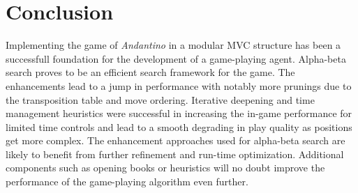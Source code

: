 \section{Conclusion}
Implementing the game of \textit{Andantino} in a modular MVC structure has been a successfull foundation for the development of a game-playing agent. Alpha-beta search proves to be an efficient search framework for the game. The enhancements lead to a jump in performance with notably more prunings due to the transposition table and move ordering. Iterative deepening and time management heuristics were successful in increasing the in-game performance for limited time controls and lead to a smooth degrading in play quality as positions get more complex. The enhancement approaches used for alpha-beta search are likely to benefit from further refinement and run-time optimization. Additional components such as opening books or heuristics will no doubt improve the performance of the game-playing algorithm even further.